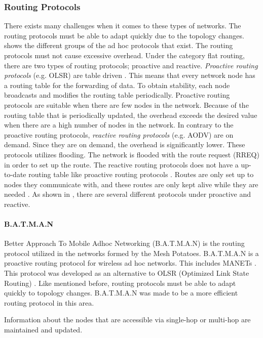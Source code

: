 \subsubsection{Routing Protocols}
There exists many challenges when it comes to these types of networks. The routing protocols must be able to adapt quickly due to the topology changes.  shows the different groups of the ad hoc protocols that exist. The routing protocols must not cause excessive overhead. Under the category flat routing, there are two types of routing protocols; proactive and reactive. \textit{Proactive routing protocols} (e.g. OLSR) are table driven \citep{proactivereactive}. This means that every network node has a routing table for the forwarding of data. To obtain stability, each node broadcasts and modifies the routing table periodically. Proactive routing protocols are suitable when there are few nodes in the network. Because of the routing table that is periodically updated, the overhead exceeds the desired value when there are a high number of nodes in the network. In contrary to the proactive routing protocols, \textit{reactive routing protocols} (e.g. AODV) are on demand. Since they are on demand, the overhead is significantly lower. These protocols utilizes flooding. The network is flooded with the route request (RREQ) in order to set up the route. The reactive routing protocols does not have a up-to-date routing table like proactive routing protocols \cite{proactivereactive}. Routes are only set up to nodes they communicate with, and these routes are only kept alive while they are needed  \cite{adhoc2}. As shown in , there are several different protocols under proactive and reactive. 

\paragraph{B.A.T.M.A.N}
Better Approach To Mobile Adhoc Networking (B.A.T.M.A.N) is the routing protocol utilized in the networks formed by the Mesh Potatoes. B.A.T.M.A.N is a proactive routing protocol for wireless ad hoc networks. This includes MANETs \cite{batman}. This protocol was developed as an alternative to OLSR (Optimized Link State Routing) \cite{batman2}. Like mentioned before, routing protocols must be able to adapt quickly to topology changes. B.A.T.M.A.N was made to be a more efficient routing protocol in this area. 

Information about the nodes that are accessible via single-hop or multi-hop are maintained and updated. 


